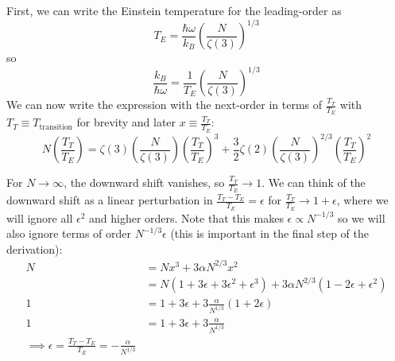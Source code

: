 \documentclass[a4paper,twoside]{article}
\begin{document}
\begin{itemize}
\begin{equation}
        \end{equation}
        \begin{problem}
            First, we can write the Einstein temperature for the leading-order as
            \begin{equation}
                T_E = \frac{\hbar \omega}{k_B} \left( \frac{N}{\zeta(3)} \right)^{1/3}
            \end{equation}
            so
            \begin{equation}
                \frac{k_B}{\hbar \omega} = \frac{1}{T_E} \left( \frac{N}{\zeta(3)} \right)^{1/3}
            \end{equation}
            We can now write the expression with the next-order in terms of $ \frac{T_T}{T_E} $ with $ T_T \equiv T_{\text{transition}} $ for brevity and later $ x \equiv\frac{T_T}{T_E} $:
            \begin{equation}
                N\left( \frac{T_T}{T_E} \right)  = \zeta(3) \left( \frac{N}{\zeta(3)} \right) \left( \frac{T_T}{T_E} \right)^3 + \frac{3}{2} \zeta(2) \left( \frac{N}{\zeta(3)} \right)^{2/3} \left( \frac{T_T}{T_E} \right)^2
            \end{equation}

            For $ N \to \infty $, the downward shift vanishes, so $ \frac{T_T}{T_E} \to 1 $. We can think of the downward shift as a linear perturbation in $ \frac{T_T - T_E}{T_E} = \epsilon $ for $ \frac{T_T}{T_E} \to 1 + \epsilon $, where we will ignore all $ \epsilon^2 $ and higher orders. Note that this makes $ \epsilon \propto N^{-1/3} $ so we will also ignore terms of order $ N^{-1/3} \epsilon $ (this is important in the final step of the derivation):
            \begin{align}
                N &= N x^3 + 3 \alpha N^{2/3} x^2 \\
                &= N(1 + 3 \epsilon + 3 \epsilon^2 + \epsilon^3) + 3 \alpha N^{2/3} (1 - 2 \epsilon + \epsilon^2) \\
                1 &= 1 + 3 \epsilon + 3 \frac{\alpha}{N^{1/3}} (1 + 2 \epsilon) \\
                1 &= 1 + 3 \epsilon + 3\frac{\alpha}{N^{1/3}} \\
                \implies \epsilon = \frac{T_T - T_E}{T_E} = - \frac{\alpha}{N^{1/3}}
            \end{align}
        \end{problem} 
\end{itemize}
\end{document}
